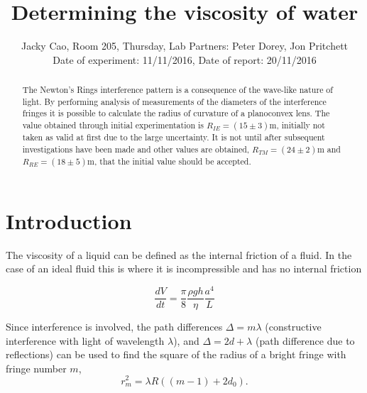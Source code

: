 \documentclass[twocolumn]{revtex4}
\begin{document}
\textheight=26.385cm

\title{Determining the viscosity of water} 
 
 
\author{Jacky Cao, Room 205, Thursday, Lab Partners: Peter Dorey, Jon Pritchett \\ Date of experiment: 11/11/2016, Date of report: 20/11/2016}


\begin{abstract}              
 
The Newton's Rings interference pattern is a consequence of the wave-like nature of light. By performing analysis of measurements of the diameters of the interference fringes it is possible to calculate the radius of curvature of a planoconvex lens. The value obtained through initial experimentation is $R_{IE}=(15\pm3)$m, initially not taken as valid at first due to the large uncertainty. It is not until after subsequent investigations have been made and other values are obtained, $R_{TM}=(24\pm2)$m and $R_{RE}=(18\pm5)$m, that the initial value should be accepted. 

\end{abstract}

\maketitle

\section{Introduction} 
\vspace{-2ex} 

The viscosity of a liquid can be defined as the internal friction of a fluid. In the case of an ideal fluid this is where it is incompressible and has no internal friction 

\begin{equation} \tag{1}
\frac{dV}{dt}=\frac{\pi}{8}\frac{\rho gh}{\eta}\frac{a^4}{L}
\end{equation}

Since interference is involved, the path differences $\Delta=m\lambda$ (constructive interference with light of wavelength $\lambda$), and $\Delta=2d+\lambda$ (path difference due to reflections) can be used to find the square of the radius of a bright fringe with fringe number $m$,
\begin{equation} \tag{2}
r_m^2=\lambda{R((m-1)+2d_0)}.
\end{equation}
\end{document}
